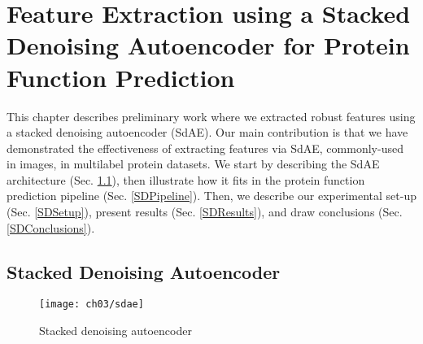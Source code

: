 %
%
%
%
%

\chapter[Stacked Denoising Autoencoder for Protein Function Prediction]{
    \huge
    Feature Extraction using a Stacked Denoising Autoencoder for Protein
    Function Prediction
}
\label{SDAEChapter}

\par This chapter describes preliminary work where we extracted robust
features using a stacked denoising autoencoder (SdAE). Our main contribution
is that we have demonstrated the effectiveness of extracting features via
SdAE, commonly-used in images, in multilabel protein datasets. We start by
describing the SdAE architecture (Sec. \ref{SDArchitecture}), then illustrate
how it fits in the protein function prediction pipeline (Sec.
\ref{SDPipeline}). Then, we describe our experimental set-up (Sec.
\ref{SDSetup}), present results (Sec. \ref{SDResults}), and draw conclusions
(Sec. \ref{SDConclusions}).

\section{Stacked Denoising Autoencoder}
\label{SDArchitecture}

\begin{wrapfigure}{r}{0.53\textwidth}
  \centering
  \texttt{[image: ch03/sdae]}
  \caption{Stacked denoising autoencoder}
  \label{schema:sdae}
\end{wrapfigure}

